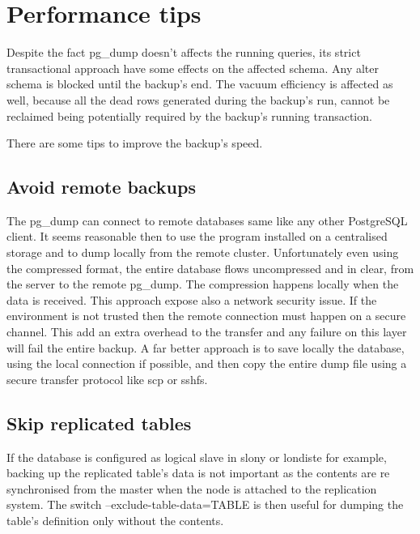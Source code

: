\section{Performance tips}
Despite the fact pg\_dump doesn't affects the running queries, its strict transactional approach 
have some effects on the affected schema. Any alter schema is blocked until the backup's end. The 
vacuum efficiency is affected as well, because all the dead rows generated during the backup's run, 
cannot be reclaimed being potentially required by the backup's running transaction.\newline

There are some tips to improve the backup's speed.

\subsection{Avoid remote backups}
The pg\_dump can connect to remote databases same like any other PostgreSQL client.
It seems reasonable then to use the program installed on a centralised storage and to dump locally 
from the remote cluster.\newline 
Unfortunately even using the compressed format, the entire database flows uncompressed and in 
clear, from the server to the remote pg\_dump. The compression happens locally when the data is 
received.\newline
This approach expose also a network security issue. If the environment is not trusted then the 
remote connection must happen on a secure channel. This add an extra overhead to the transfer and 
any failure on this layer will fail the entire backup.\newline
A far better approach is to save locally the database, using the local connection if possible, and 
then copy the entire dump file using a secure transfer protocol like scp or sshfs.

\subsection{Skip replicated tables}
If the database is configured as logical slave in slony or londiste for example, backing up the 
replicated table's data is not important as the contents are re synchronised from the master when 
the node is attached to the replication system. The switch --exclude-table-data=TABLE is then 
useful for dumping the table's definition only without the contents.

